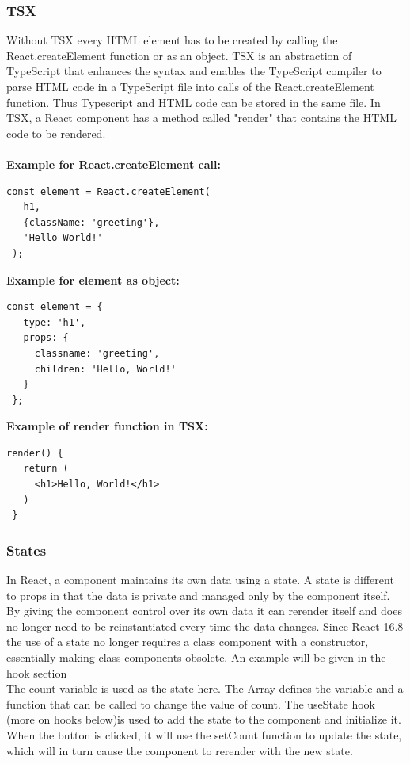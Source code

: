 \subsubsection{TSX}
Without TSX every HTML element has to be created by calling the React.createElement function or as an object. TSX is an abstraction of TypeScript that enhances the syntax and enables the TypeScript compiler to parse HTML code in a TypeScript file into calls of the React.createElement function. Thus Typescript and HTML code can be stored in the same file. In TSX, a React component has a method called "render" that contains the HTML code to be rendered.\\\\
\textbf{Example for React.createElement call:}
\begin{Verbatim}[frame=single]
 const element = React.createElement(
   h1,
   {className: 'greeting'},
   'Hello World!'
 );
\end{Verbatim}
\textbf{Example for element as object:}
\begin{Verbatim}[frame=single]
 const element = {
   type: 'h1',
   props: {
     classname: 'greeting',
     children: 'Hello, World!'
   }
 };
\end{Verbatim}
\textbf{Example of render function in TSX:}
\begin{Verbatim}[frame=single]
 render() {
   return (
     <h1>Hello, World!</h1>
   )    
 }
\end{Verbatim}

\subsubsection{States}
In React, a component maintains its own data using a state. A state is different to props in that the data is private and managed only by the component itself.
By giving the component control over its own data it can rerender itself and does no longer need to be reinstantiated every time the data changes. Since React 16.8 the use of a state no longer requires a class component with a constructor, essentially making class components obsolete. An example will be given in the hook section\\

The count variable is used as the state here. The Array defines the variable and a function that can be called to change the value of count. The useState hook (more on hooks below)is used to add the state to the component and initialize it. When the button is clicked, it will use the setCount function to update the state, which will in turn cause the component to rerender with the new state.
\pagebreak
